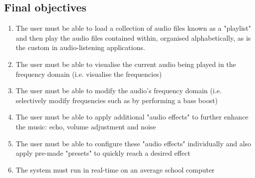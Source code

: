 \pagebreak
\subsection{Final objectives}
\begin{enumerate}
	\item  The user must be able to load a collection of audio files known as a "playlist" and then play the audio files contained within, organised alphabetically, as is the custom in audio-listening applications.
	\item  The user must be able to visualise the current audio being played in the frequency domain (i.e. visualise the frequencies)
	\item The user must be able to modify the audio's frequency domain (i.e. selectively modify frequencies such as by performing a bass boost)
	\item The user must be able to apply additional "audio effects" to further enhance the music: echo, volume adjustment and noise
	\item The user must be able to configure these "audio effects" individually and also apply pre-made "presets" to quickly reach a desired effect
	\item  The system must run in real-time on an average school computer
\end{enumerate}
